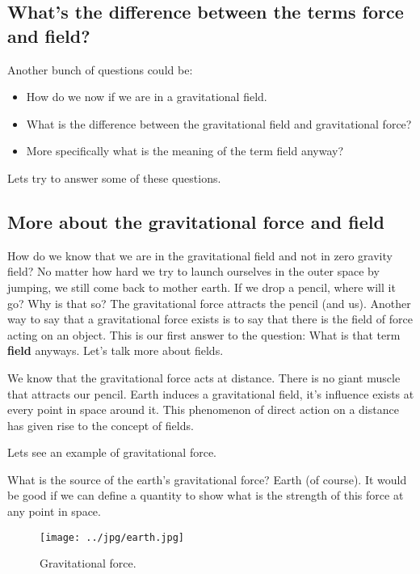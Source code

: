 \subsection{What's the difference between the terms force and field?}

Another bunch of questions could be:
\begin{itemize}
\item How do we now if we are in a gravitational field.
\item What is the difference between the gravitational field and gravitational force?
\item More specifically what is the meaning of the term field anyway?
\end{itemize}

Lets try to answer some of these questions.

\subsection{More about the gravitational force and field}

How do we know that we are in the gravitational field and not in zero gravity field? No matter how hard we try to launch ourselves in the outer space by jumping, we still come back to mother earth. If we drop a pencil, where will it go? Why is that so? The gravitational force attracts the pencil (and us).  Another way to say that a gravitational force exists is to say that there is the field of force acting on an object. This is our first answer to the question: What is that term {\bf field} anyways. Let's talk more about fields.

We know that the gravitational force acts at distance. There is no giant muscle that attracts our pencil. Earth induces a gravitational field, it's influence exists at every point in space around it. This phenomenon of direct action on a distance has given rise to the concept of fields.  

Lets see an example of gravitational force. 

What is the source of the earth's gravitational force? Earth (of course). It would be good if we can define a quantity to show what is the strength of this force at any point in space. 



\begin{figure}[htbp]
\begin{center}
\texttt{[image: ../jpg/earth.jpg]}
\end{center}
\caption{Gravitational force.}
\label{wind}
\end{figure}






